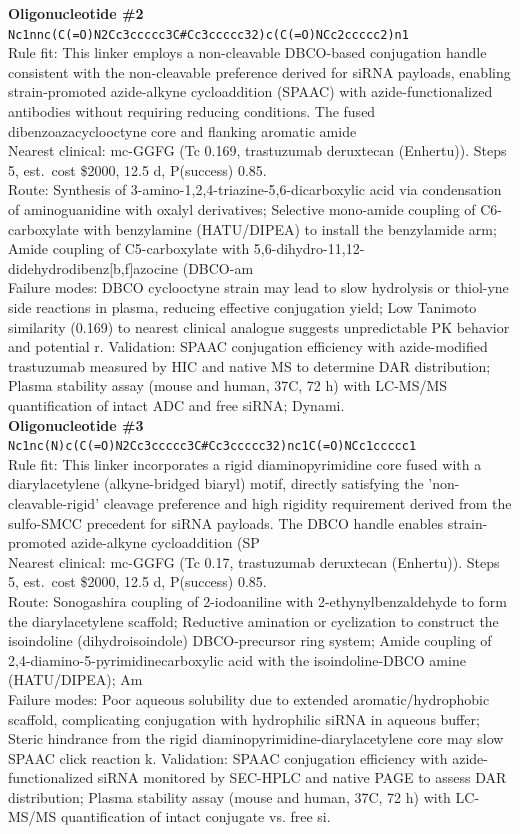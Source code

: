 \documentclass[10pt]{article}
\begin{document}
\noindent\textbf{Oligonucleotide \#2} \\ \texttt{Nc1nnc(C(=O)N2Cc3ccccc3C\#Cc3ccccc32)c(C(=O)NCc2ccccc2)n1} \\ Rule fit: This linker employs a non-cleavable DBCO-based conjugation handle consistent with the non-cleavable preference derived for siRNA payloads, enabling strain-promoted azide-alkyne cycloaddition (SPAAC) with azide-functionalized antibodies without requiring reducing conditions. The fused dibenzoazacyclooctyne core and flanking aromatic amide  \\ Nearest clinical: mc-GGFG (Tc 0.169, trastuzumab deruxtecan (Enhertu)). Steps 5, est.\ cost \$2000, 12.5 d, P(success) 0.85. \\ Route: Synthesis of 3-amino-1,2,4-triazine-5,6-dicarboxylic acid via condensation of aminoguanidine with oxalyl derivatives; Selective mono-amide coupling of C6-carboxylate with benzylamine (HATU/DIPEA) to install the benzylamide arm; Amide coupling of C5-carboxylate with 5,6-dihydro-11,12-didehydrodibenz[b,f]azocine (DBCO-am \\ Failure modes: DBCO cyclooctyne strain may lead to slow hydrolysis or thiol-yne side reactions in plasma, reducing effective conjugation yield; Low Tanimoto similarity (0.169) to nearest clinical analogue suggests unpredictable PK behavior and potential r. Validation: SPAAC conjugation efficiency with azide-modified trastuzumab measured by HIC and native MS to determine DAR distribution; Plasma stability assay (mouse and human, 37\textdegree{}C, 72 h) with LC-MS/MS quantification of intact ADC and free siRNA; Dynami. \\[0.4em]
\noindent\textbf{Oligonucleotide \#3} \\ \texttt{Nc1nc(N)c(C(=O)N2Cc3ccccc3C\#Cc3ccccc32)nc1C(=O)NCc1ccccc1} \\ Rule fit: This linker incorporates a rigid diaminopyrimidine core fused with a diarylacetylene (alkyne-bridged biaryl) motif, directly satisfying the 'non-cleavable-rigid' cleavage preference and high rigidity requirement derived from the sulfo-SMCC precedent for siRNA payloads. The DBCO handle enables strain-promoted azide-alkyne cycloaddition (SP \\ Nearest clinical: mc-GGFG (Tc 0.17, trastuzumab deruxtecan (Enhertu)). Steps 5, est.\ cost \$2000, 12.5 d, P(success) 0.85. \\ Route: Sonogashira coupling of 2-iodoaniline with 2-ethynylbenzaldehyde to form the diarylacetylene scaffold; Reductive amination or cyclization to construct the isoindoline (dihydroisoindole) DBCO-precursor ring system; Amide coupling of 2,4-diamino-5-pyrimidinecarboxylic acid with the isoindoline-DBCO amine (HATU/DIPEA); Am \\ Failure modes: Poor aqueous solubility due to extended aromatic/hydrophobic scaffold, complicating conjugation with hydrophilic siRNA in aqueous buffer; Steric hindrance from the rigid diaminopyrimidine-diarylacetylene core may slow SPAAC click reaction k. Validation: SPAAC conjugation efficiency with azide-functionalized siRNA monitored by SEC-HPLC and native PAGE to assess DAR distribution; Plasma stability assay (mouse and human, 37\textdegree{}C, 72 h) with LC-MS/MS quantification of intact conjugate vs. free si. \\[0.4em]
\end{document}
